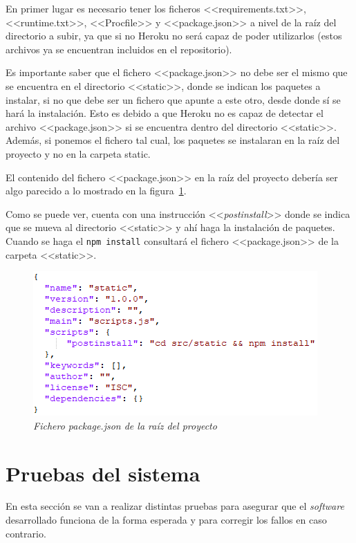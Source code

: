 En primer lugar es necesario tener los ficheros <<requirements.txt>>, <<runtime.txt>>, <<Procfile>> y <<package.json>> a nivel de la raíz del directorio a subir, ya que si no Heroku no será capaz de poder utilizarlos (estos archivos ya se encuentran incluidos en el repositorio).

Es importante saber que el fichero <<package.json>> no debe ser el mismo que se encuentra en el directorio <<static>>, donde se indican los paquetes a instalar, si no que debe ser un fichero que apunte a este otro, desde donde sí se hará la instalación. 
Esto es debido a que Heroku no es capaz de detectar el archivo <<package.json>> si se encuentra dentro del directorio <<static>>. Además, si ponemos el fichero tal cual, los paquetes se instalaran en la raíz del proyecto y no en la carpeta static.

El contenido del fichero <<package.json>> en la raíz del proyecto debería ser algo parecido a lo mostrado en la figura~\ref{fig:ficheroPackage}.

Como se puede ver, cuenta con una instrucción <<\textit{postinstall}>> donde se indica que se mueva al directorio <<static>> y ahí haga la instalación de paquetes.
Cuando se haga el \texttt{npm install} consultará el fichero <<package.json>> de la carpeta <<static>>.

\begin{figure}
	\centering
	\includegraphics[width=.8\textwidth]{../img/Anexos/ManualProgramador/package.png}
	\caption{\textit{Fichero package.json de la raíz del proyecto}}\label{fig:ficheroPackage}
\end{figure}


\section{Pruebas del sistema}
En esta sección se van a realizar distintas pruebas para asegurar que el \textit{software} desarrollado funciona de la forma esperada y para corregir los fallos en caso contrario.

